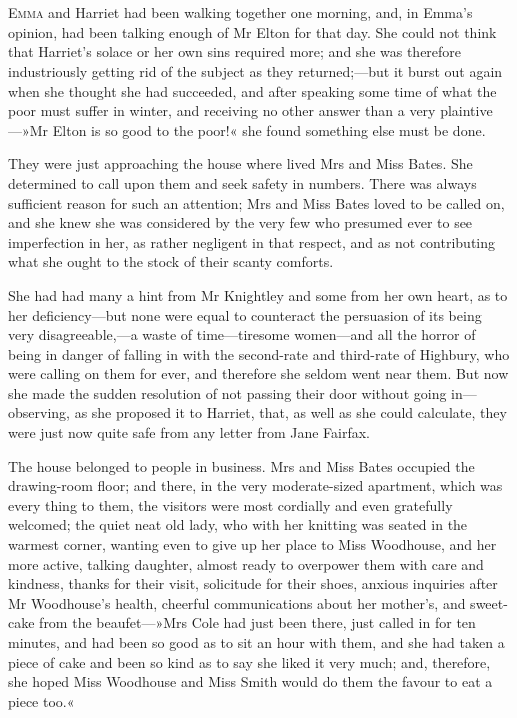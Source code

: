 \chapter[Chapter \thechapter]{}
\lettrine[lines=4,lraise=0.3]{E}{mma} and Harriet had been walking together one morning, and, in Emma's opinion, had been talking enough of Mr Elton for that day. She could not think that Harriet's solace or her own sins required more; and she was therefore industriously getting rid of the subject as they returned;—but it burst out again when she thought she had succeeded, and after speaking some time of what the poor must suffer in winter, and receiving no other answer than a very plaintive—»Mr Elton is so good to the poor!« she found something else must be done.

They were just approaching the house where lived Mrs and Miss Bates. She determined to call upon them and seek safety in numbers. There was always sufficient reason for such an attention; Mrs and Miss Bates loved to be called on, and she knew she was considered by the very few who presumed ever to see imperfection in her, as rather negligent in that respect, and as not contributing what she ought to the stock of their scanty comforts.

She had had many a hint from Mr Knightley and some from her own heart, as to her deficiency—but none were equal to counteract the persuasion of its being very disagreeable,—a waste of time—tiresome women—and all the horror of being in danger of falling in with the second-rate and third-rate of Highbury, who were calling on them for ever, and therefore she seldom went near them. But now she made the sudden resolution of not passing their door without going in—observing, as she proposed it to Harriet, that, as well as she could calculate, they were just now quite safe from any letter from Jane Fairfax.

The house belonged to people in business. Mrs and Miss Bates occupied the drawing-room floor; and there, in the very moderate-sized apartment, which was every thing to them, the visitors were most cordially and even gratefully welcomed; the quiet neat old lady, who with her knitting was seated in the warmest corner, wanting even to give up her place to Miss Woodhouse, and her more active, talking daughter, almost ready to overpower them with care and kindness, thanks for their visit, solicitude for their shoes, anxious inquiries after Mr Woodhouse's health, cheerful communications about her mother's, and sweet-cake from the beaufet—»Mrs Cole had just been there, just called in for ten minutes, and had been so good as to sit an hour with them, and she had taken a piece of cake and been so kind as to say she liked it very much; and, therefore, she hoped Miss Woodhouse and Miss Smith would do them the favour to eat a piece too.«

